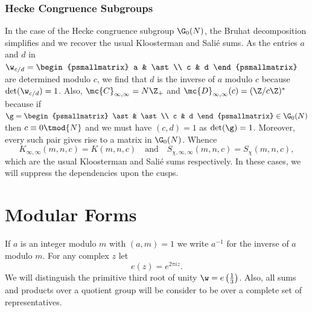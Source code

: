\documentclass[12pt]{article}
\begin{document}
      \subsubsection*{Hecke Congruence Subgroups}
        In the case of the Hecke congruence subgroup \(\G_{0}(N)\), the Bruhat decomposition simplifies and we recover the usual Kloosterman and Sali\'e sums. As the entries \(a\) and \(d\) in \(\w_{c/d} = \begin{psmallmatrix} a & \ast \\ c & d \end{psmallmatrix}\) are determined modulo \(c\), we find that \(d\) is the inverse of \(a\) modulo \(c\) because \(\det(\w_{c/d}) = 1\). Also, \(\mc{C}_{\infty,\infty} = N\Z_{+}\) and \(\mc{D}_{\infty,\infty}(c) = (\Z/c\Z)^{\ast}\) because if \(\g = \begin{psmallmatrix} \ast & \ast \\ c & d \end{psmallmatrix} \in \G_{0}(N)\) then \(c \equiv 0 \tmod{N}\) and we must have \((c,d) = 1\) as \(\det(\g) = 1\). Moreover, every such pair gives rise to a matrix in \(\G_{0}(N)\). Whence
      \[
        K_{\infty,\infty}(m,n,c) = K(m,n,c) \quad \text{and} \quad S_{\chi,\infty,\infty}(m,n,c) = S_{\chi}(m,n,c),
      \]
      which are the usual Kloosterman and Sali\'e sums respectively. In these cases, we will suppress the dependencies upon the cusps.
  \section{Modular Forms}
    If \(a\) is an integer modulo \(m\) with \((a,m) = 1\) we write \(a^{-1}\) for the inverse of \(a\) modulo \(m\). For any complex \(z\) let
    \[
      e(z) = e^{2\pi iz}.
    \]
    We will distinguish the primitive third root of unity \(\w = e\left(\frac{1}{3}\right)\). Also, all sums and products over a quotient group will be consider to be over a complete set of representatives.
\end{document}
